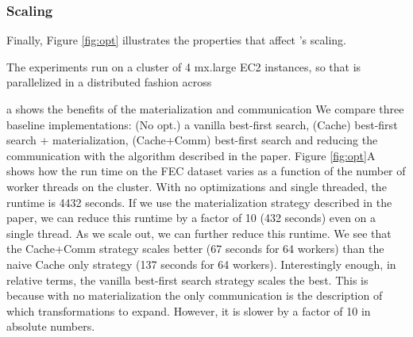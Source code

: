 

\subsubsection{Scaling}
Finally, Figure \ref{fig:opt} illustrates the properties that affect \sys's scaling.  

The experiments run on a cluster of 4 mx.large EC2 instances, so that \sys is parallelized in a distributed fashion across

a shows the benefits of the materialization and communication We compare three baseline implementations: (No opt.) a vanilla best-first search, (Cache) best-first search + materialization, (Cache+Comm) best-first search and reducing the communication with the algorithm described in the paper. 
Figure \ref{fig:opt}A shows how the run time on the FEC dataset varies as a function of the number of worker threads on the cluster.
With no optimizations and single threaded, the runtime is 4432 seconds.
If we use the materialization strategy described in the paper, we can reduce this runtime by a factor of 10 (432 seconds) even on a single thread.
As we scale out, we can further reduce this runtime.
We see that the Cache+Comm strategy scales better (67 seconds for 64 workers) than the naive Cache only strategy (137 seconds for 64 workers).
Interestingly enough, in relative terms, the vanilla best-first search strategy scales the best.
This is because with no materialization the only communication is the description of which transformations to expand.
However, it is slower by a factor of 10 in absolute numbers.

